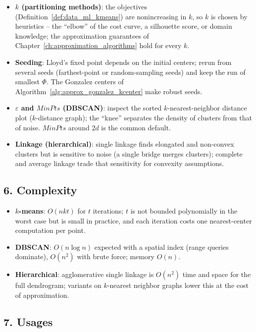\begin{itemize}
\item \textbf{$k$ (partitioning methods)}: the objectives
  (Definition~\ref{def:data_ml_kmeans}) are nonincreasing in $k$, so $k$ is
  chosen by heuristics -- the ``elbow'' of the cost curve, a silhouette
  score, or domain knowledge; the approximation guarantees of
  Chapter~\ref{ch:approximation_algorithms} hold for every $k$.
\item \textbf{Seeding}: Lloyd's fixed point depends on the initial centers;
  rerun from several seeds (farthest-point or random-sampling seeds) and
  keep the run of smallest $\Phi$. The Gonzalez centers of
  Algorithm~\ref{alg:approx_gonzalez_kcenter} make robust seeds.
\item \textbf{$\varepsilon$ and $\mathit{MinPts}$ (DBSCAN)}: inspect the
  sorted $k$-nearest-neighbor distance plot ($k$-distance graph); the ``knee''
  separates the density of clusters from that of noise. $\mathit{MinPts}$
  around $2d$ is the common default.
\item \textbf{Linkage (hierarchical)}: single linkage finds elongated and
  non-convex clusters but is sensitive to noise (a single bridge merges
  clusters); complete and average linkage trade that sensitivity for
  convexity assumptions.
\end{itemize}

\subsection{6. Complexity}

\begin{itemize}
\item \textbf{$k$-means}: $O(n k t)$ for $t$ iterations; $t$ is not bounded
  polynomially in the worst case but is small in practice, and each
  iteration costs one nearest-center computation per point.
\item \textbf{DBSCAN}: $O(n \log n)$ expected with a spatial index (range
  queries dominate), $O(n^2)$ with brute force; memory $O(n)$.
\item \textbf{Hierarchical}: agglomerative single linkage is
  $O(n^2)$ time and space for the full dendrogram; variants on $k$-nearest
  neighbor graphs lower this at the cost of approximation.
\end{itemize}

\subsection{7. Usages}


